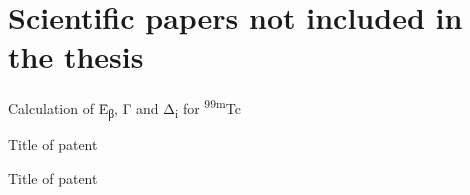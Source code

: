 \documentclass[
English,                 %
includepublications,    %
%
%
%
%
%
%
%
%
%
%
%
%
%
%
%
%
%
%
]{kththesis}
\begin{document}
    \section*{Scientific papers not included in the thesis}
    {\FigtreeFont\fontsize{11}{13}\selectfont
    \begin{ListOfPapers}
    \item\label{paper:F} 

    \item\label{paper:G} Calculation of {\mystixmathfont \={Ε}\textsubscript{β}}, {\mystixmathfont Γ} and {\mystixmathfont Δ\textsubscript{i}} for \textsuperscript{99m}Tc

    \end{ListOfPapers}

    \begin{ListOfPatents}
        \item \label{patent:C} Title of patent
        \item \label{patent:D} Title of patent
    \end{ListOfPatents}
    } %

\end{document}
